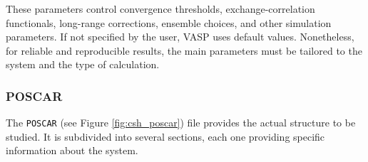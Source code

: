 These parameters control convergence thresholds, exchange-correlation functionals, long-range corrections, ensemble choices, and other simulation parameters. If not specified by the user, VASP uses default values. Nonetheless, for reliable and reproducible results, the main parameters must be tailored to the system and the type of calculation.


\subsubsection{POSCAR}
The \texttt{POSCAR} (see Figure \ref{fig:csh_poscar}) file provides the actual structure to be studied. It is subdivided into several sections, each one providing specific information about the system.
\begin{figure}[H]
\end{figure}
